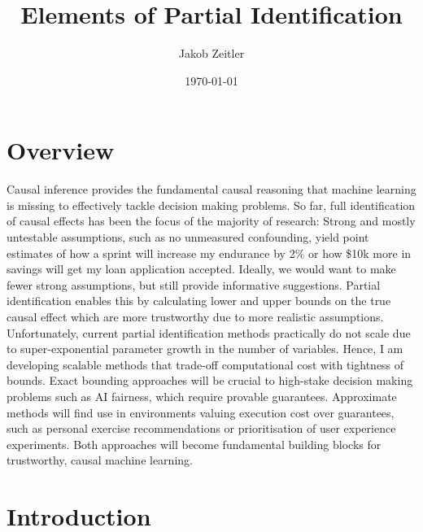 \documentclass{article}
\title{Elements of Partial Identification}
\author{Jakob Zeitler}
\date{\today}
\begin{document}
\newcommand\barbelow[1]{\stackunder[1.2pt]{$#1$}{\rule{.8ex}{.075ex}}}


\maketitle


\section*{Overview}

Causal inference provides the fundamental causal reasoning that machine learning is missing to effectively tackle decision making problems. So far, full identification of causal effects has been the focus of the majority of research: Strong and mostly untestable assumptions, such as no unmeasured confounding, yield point estimates of how a sprint will increase my endurance by 2\% or how \$10k more in savings will get my loan application accepted. Ideally, we would want to make fewer strong assumptions, but still provide informative suggestions. Partial identification enables this by calculating lower and upper bounds on the true causal effect which are more trustworthy due to more realistic assumptions. Unfortunately, current partial identification methods practically do not scale due to super-exponential parameter growth in the number of variables. Hence, I am developing scalable methods that trade-off computational cost with tightness of bounds. Exact bounding approaches will be crucial to high-stake decision making problems such as AI fairness, which require provable guarantees. Approximate methods will find use in environments valuing execution cost over guarantees, such as personal exercise recommendations or prioritisation of user experience experiments. Both approaches will become fundamental building blocks for trustworthy, causal machine learning.

\newpage

\tableofcontents

\newpage

\section{Introduction}
\end{document}
